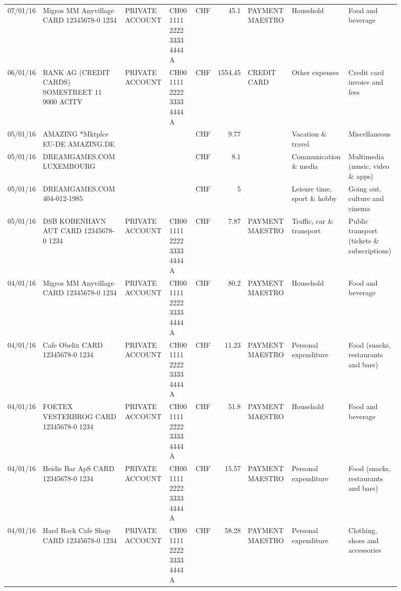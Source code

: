 \begin{landscape}
\begin{sidewaysfigure}
\begin{table}[h]
\begin{center}
\begin{tabular}{rllllrlll}
		07/01/16 & Migros MM Anyvillage CARD 12345678-0 1234 & PRIVATE ACCOUNT & CH00 1111 2222 3333 4444 A & CHF   & 45.1  & PAYMENT MAESTRO & Household & Food and beverage \\
		06/01/16 & BANK AG (CREDIT CARDS) SOMESTREET 11 9000 ACITY & PRIVATE ACCOUNT & CH00 1111 2222 3333 4444 A & CHF   & 1554.45 & CREDIT CARD & Other expenses & Credit card invoice and fees \\
		05/01/16 & AMAZING *Mktplce EU-DE    AMAZING.DE &       &       & CHF   & 9.77  &       & Vacation \& travel & Miscellaneous \\
		05/01/16 & DREAMGAMES.COM           LUXEMBOURG &       &       & CHF   & 8.1   &       & Communication \& media & Multimedia (music, video \& apps) \\
		05/01/16 & DREAMGAMES.COM           404-012-1985 &       &       & CHF   & 5     &       & Leisure time, sport \& hobby & Going out, culture and cinema \\
		05/01/16 & DSB KOBENHAVN AUT CARD 12345678-0 1234 & PRIVATE ACCOUNT & CH00 1111 2222 3333 4444 A & CHF   & 7.87  & PAYMENT MAESTRO & Traffic, car \& transport & Public transport (tickets \& subscriptions) \\
		04/01/16 & Migros MM Anyvillage CARD 12345678-0 1234 & PRIVATE ACCOUNT & CH00 1111 2222 3333 4444 A & CHF   & 80.2  & PAYMENT MAESTRO & Household & Food and beverage \\
		04/01/16 & Cafe Obelix CARD 12345678-0 1234 & PRIVATE ACCOUNT & CH00 1111 2222 3333 4444 A & CHF   & 11.23 & PAYMENT MAESTRO & Personal expenditure & Food (snacks, restaurants and bars) \\
		04/01/16 & FOETEX VESTERBROG CARD 12345678-0 1234 & PRIVATE ACCOUNT & CH00 1111 2222 3333 4444 A & CHF   & 51.8  & PAYMENT MAESTRO & Household & Food and beverage \\
		04/01/16 & Heidis Bar ApS CARD 12345678-0 1234 & PRIVATE ACCOUNT & CH00 1111 2222 3333 4444 A & CHF   & 15.57 & PAYMENT MAESTRO & Personal expenditure & Food (snacks, restaurants and bars) \\
		04/01/16 & Hard Rock Cafe Shop CARD 12345678-0 1234 & PRIVATE ACCOUNT & CH00 1111 2222 3333 4444 A & CHF   & 58.28 & PAYMENT MAESTRO & Personal expenditure & Clothing, shoes and accessories \\
	\end{tabular}%
		\end{center}
	\label{tab:addlabel}%
\end{table}%

\end{sidewaysfigure}
\end{landscape}

